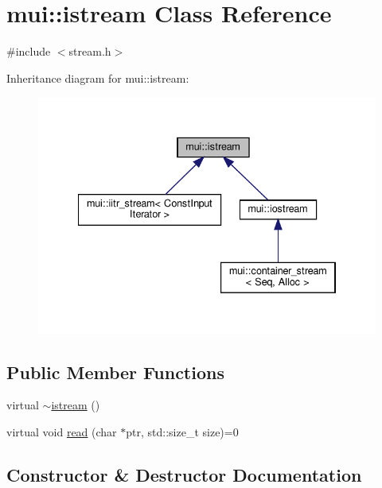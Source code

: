 \hypertarget{classmui_1_1istream}{}\section{mui\+:\+:istream Class Reference}
\label{classmui_1_1istream}


{\ttfamily \#include $<$stream.\+h$>$}



Inheritance diagram for mui\+:\+:istream\+:
\nopagebreak
\begin{figure}[H]
\begin{center}
\leavevmode
\includegraphics[width=334pt]{classmui_1_1istream__inherit__graph}
\end{center}
\end{figure}
\subsection*{Public Member Functions}
\begin{DoxyCompactItemize}
\item 
virtual \hyperlink{classmui_1_1istream_a0aaf466019e7a6f84002a738c26d2e9d}{$\sim$istream} ()
\item 
virtual void \hyperlink{classmui_1_1istream_a275ecbe530bf67df5978be288897ab45}{read} (char $\ast$ptr, std\+::size\+\_\+t size)=0
\end{DoxyCompactItemize}


\subsection{Constructor \& Destructor Documentation}
\mbox{\label{classmui_1_1istream_a0aaf466019e7a6f84002a738c26d2e9d}} 
